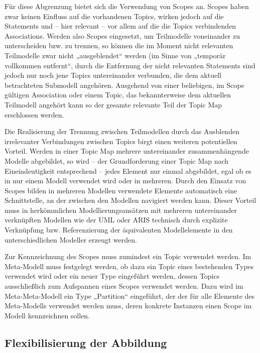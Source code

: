 Für diese Abgrenzung bietet sich die Verwendung von Scopes an. Scopes haben zwar keinen Einfluss auf die vorhandenen Topics, wirken jedoch auf die Statements und -- hier relevant -- vor allem auf die die Topics verbindenden Associations. Werden also Scopes eingesetzt, um Teilmodelle voneinander zu unterscheiden bzw. zu trennen, so können die im Moment nicht relevanten Teilmodelle zwar nicht „ausgeblendet“ werden (im Sinne von „temporär vollkommen entfernt“, durch die Entfernung der nicht relevanten Statements sind jedoch nur noch jene Topics untereinander verbunden, die dem aktuell betrachteten Submodell angehören. Ausgehend von einer beliebigen, im Scope gültigen Association oder einem Topic, das bekannterweise dem aktuellen Teilmodell angehört kann so der gesamte relevante Teil der Topic Map erschlossen werden.

Die Realisierung der Trennung zwischen Teilmodellen durch das Ausblenden irrelevanter Verbindungen zwischen Topics birgt einen weiteren potentiellen Vorteil. Werden in einer Topic Map mehrere untereinander zusammenhängende Modelle abgebildet, so wird -- der Grundforderung einer Topic Map nach Eineindeutigkeit entsprechend -- jedes Element nur einmal abgebildet, egal ob es in nur einem Modell verwendet wird oder in mehreren. Durch den Einsatz von Scopes bilden in mehreren Modellen verwendete Elemente automatisch eine Schnittstelle, an der zwischen den Modellen navigiert werden kann. Dieser Vorteil muss in herkömmlichen Modellierungsansätzen mit mehreren untereinander verknüpften Modellen wie der \gls{UML} \citep{Rumbaugh04} oder ARIS \citep{Scheer03} technisch durch explizite Verknüpfung bzw. Referenzierung der äquivalenten Modellelemente in den unterschiedlichen Modeller erzeugt werden. 

Zur Kennzeichnung des Scopes muss zumindest ein Topic verwendet werden. Im Meta-Modell muss festgelegt werden, ob dazu ein Topic eines bestehenden Types verwendet wird oder ein neuer Type eingeführt werden, dessen Topics ausschließlich zum Aufspannen eines Scopes verwendet werden. Dazu wird im Meta-Meta-Modell ein Type „Partition“ eingeführt, der der für alle Elemente des Meta-Modells verwendet werden muss, deren konkrete Instanzen einen Scope im Modell kennzeichnen sollen.


\subsection{Flexibilisierung der Abbildung}
\label{sub:flexibilisierung_der_abbildung}

